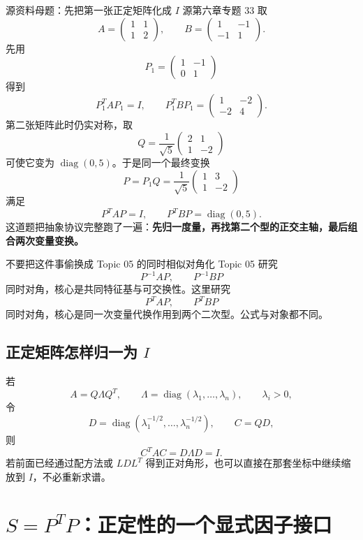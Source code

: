 \documentclass[11pt,a4paper]{ctexart}
\newcommand{\kw}[1]{\textbf{\color{deep}#1}}
\begin{document}
\begin{examplebox}{源资料母题：先把第一张正定矩阵化成 $I$}
源第六章专题 33 取
\[
A=\begin{pmatrix}1&1\\1&2\end{pmatrix},
\qquad
B=\begin{pmatrix}1&-1\\-1&1\end{pmatrix}.
\]
先用
\[
P_1=\begin{pmatrix}1&-1\\0&1\end{pmatrix}
\]
得到
\[
P_1^TAP_1=I,
\qquad
P_1^TBP_1=\begin{pmatrix}1&-2\\-2&4\end{pmatrix}.
\]
第二张矩阵此时仍实对称，取
\[
Q=\frac1{\sqrt5}\begin{pmatrix}2&1\\1&-2\end{pmatrix}
\]
可使它变为 $\operatorname{diag}(0,5)$。于是同一个最终变换
\[
\boxed{P=P_1Q=\frac1{\sqrt5}\begin{pmatrix}1&3\\1&-2\end{pmatrix}}
\]
满足
\[
P^TAP=I,
\qquad
P^TBP=\operatorname{diag}(0,5).
\]
这道题把抽象协议完整跑了一遍：\kw{先归一度量，再找第二个型的正交主轴，最后组合两次变量变换。}
\end{examplebox}

\begin{warnbox}{不要把这件事偷换成 Topic 05 的同时相似对角化}
Topic 05 研究
\[
P^{-1}AP,\qquad P^{-1}BP
\]
同时对角，核心是共同特征基与可交换性。这里研究
\[
P^TAP,\qquad P^TBP
\]
同时对角，核心是同一次变量代换作用到两个二次型。公式与对象都不同。
\end{warnbox}

\subsection{正定矩阵怎样归一为 $I$}

若
\[
A=Q\Lambda Q^T,
\qquad
\Lambda=\operatorname{diag}(\lambda_1,\dots,\lambda_n),
\qquad \lambda_i>0,
\]
令
\[
D=\operatorname{diag}(\lambda_1^{-1/2},\dots,\lambda_n^{-1/2}),
\qquad
C=QD,
\]
则
\[
C^TAC=D\Lambda D=I.
\]
若前面已经通过配方法或 $LDL^T$ 得到正对角形，也可以直接在那套坐标中继续缩放到 $I$，不必重新求谱。

\section{$S=P^TP$：正定性的一个显式因子接口}
\end{document}
